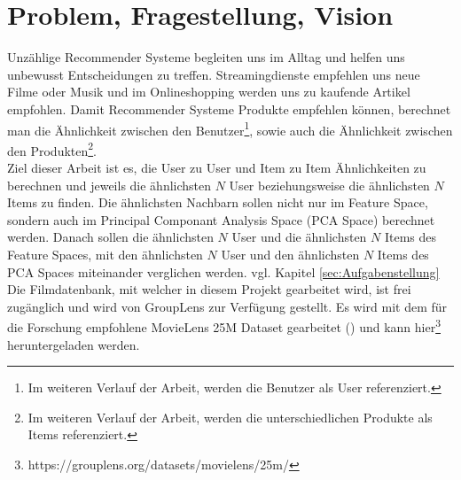 \chapter{Problem, Fragestellung, Vision}
\label{ch:ProblemFragestellungVision}
Unzählige Recommender Systeme begleiten uns im Alltag und helfen uns unbewusst Entscheidungen zu treffen. Streamingdienste empfehlen uns neue Filme oder Musik und im Onlineshopping werden uns zu kaufende Artikel empfohlen. Damit Recommender Systeme Produkte empfehlen können, berechnet man die Ähnlichkeit zwischen den Benutzer\footnote{Im weiteren Verlauf der Arbeit, werden die Benutzer als User referenziert.}, sowie auch die Ähnlichkeit zwischen den Produkten\footnote{Im weiteren Verlauf der Arbeit, werden die unterschiedlichen Produkte als Items referenziert.}.\\

\noindent Ziel dieser Arbeit ist es, die User zu User und Item zu Item Ähnlichkeiten zu berechnen und jeweils die ähnlichsten $N$ User beziehungsweise die ähnlichsten $N$ Items zu finden.
Die ähnlichsten Nachbarn sollen nicht nur im Feature Space, sondern auch im Principal Componant Analysis Space (PCA Space) berechnet werden. Danach sollen die ähnlichsten $N$ User und die ähnlichsten $N$ Items des Feature Spaces, mit den ähnlichsten $N$ User und den ähnlichsten $N$ Items des PCA Spaces miteinander verglichen werden. vgl.  Kapitel \ref{sec:Aufgabenstellung} \\

\noindent Die Filmdatenbank, mit welcher in diesem Projekt gearbeitet wird, ist frei zugänglich und wird von GroupLens zur Verfügung gestellt. Es wird mit dem für die Forschung empfohlene MovieLens 25M Dataset gearbeitet (\cite{10.1145/2827872}) und kann hier\footnote{https://grouplens.org/datasets/movielens/25m/} heruntergeladen werden.


